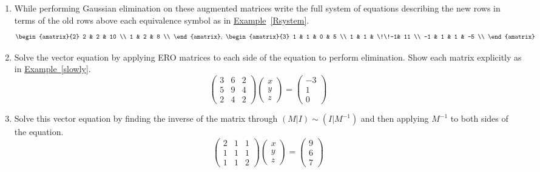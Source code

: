 


\begin{enumerate}

\item While performing  Gaussian elimination on these augmented matrices write the full system of equations describing the new rows in terms of the old rows above each equivalence symbol as in  \hyperlink{Keeping track of EROs with equations between rows}{Example}~\ref{Rsystem}. 
\[
\begin{amatrix}{2} 
2 & 2 & 10 \\
1 & 2 & 8 \\
\end{amatrix}
,~
\begin{amatrix}{3} 
1 & 1 & 0 & 5 \\
1 & 1 & \!\!-1& 11 \\
-1 & 1 & 1 & -5 \\ 
\end{amatrix}
\]


\item Solve the vector equation by applying ERO matrices to each side of the equation to perform elimination. Show each matrix explicitly as in \hyperlink{Undoing}{Example~\ref*{slowly}}.
\[
\begin{pmatrix}
3	&6 	&2 \\ %
5 	&9 	&4 \\ %
2	&4	&2 %
\end{pmatrix} 
\begin{pmatrix}
 x \\ 
y \\
z 
\end{pmatrix} 
=
\begin{pmatrix}
-3 \\ 
1  \\
0 
\end{pmatrix} 
\]


\item Solve this vector equation by finding the inverse of the matrix through $(M|I)\sim (I|M^{-1})$ and then applying $M^{-1}$ to both sides of the equation. 
\[
\begin{pmatrix}
2	&1 	&1 \\ %
1 	&1 	&1 \\ %
1	&1	&2 %
\end{pmatrix} 
\begin{pmatrix}
 x \\ 
y \\
z 
\end{pmatrix} 
=
\begin{pmatrix}
9 \\ 
6  \\
7 
\end{pmatrix} 
\]



\end{enumerate}
